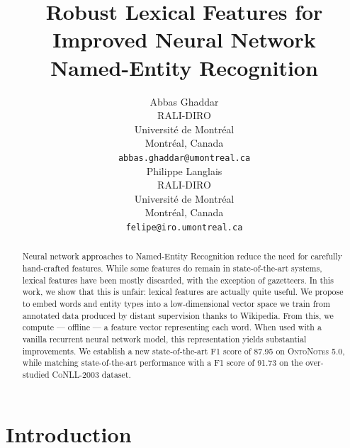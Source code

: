 \documentclass[11pt]{article}
\title{Robust Lexical Features for Improved Neural Network\\Named-Entity Recognition}
\author{Abbas Ghaddar \\
	RALI-DIRO \\
	Universit\'e de Montr\'eal \\
	Montr\'eal, Canada \\
	{\tt abbas.ghaddar@umontreal.ca} \\\And
	Philippe Langlais \\
	RALI-DIRO \\
	Universit\'e de Montr\'eal \\
	Montr\'eal, Canada \\
	{\tt felipe@iro.umontreal.ca} \\}
\date{}
\newcommand{\conll}{\textsc{CoNLL}}
\newcommand{\onto}{\textsc{OntoNotes}}
\begin{document}
	\maketitle
	\begin{abstract}
		Neural network approaches to Named-Entity Recognition reduce the need for carefully hand-crafted features. While some features do remain in state-of-the-art systems, lexical features have been mostly discarded, with the exception of gazetteers. In this work, we show that this is unfair: lexical features are actually quite useful. We  propose to embed words and entity types into a low-dimensional vector space we train from annotated data produced by distant supervision thanks to Wikipedia. From this, we compute --- offline --- a feature vector representing each word. When used with a vanilla recurrent neural network model, this representation yields substantial improvements. We establish a new state-of-the-art  F1 score of 87.95 on  \onto{ 5.0}, while matching state-of-the-art performance with a F1 score of 91.73 on the over-studied \conll{-2003} dataset.

	\end{abstract}
	
	\section{Introduction}
	
	
\end{document}
